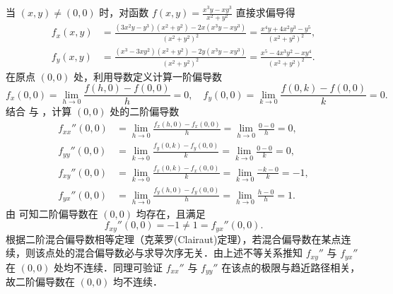 \begin{myproof}
    当 $(x, y) \neq (0, 0)$ 时，对函数 $f(x, y) = \frac{x^3 y - x y^3}{x^2 + y^2}$ 直接求偏导得
    \begin{equation}
        \label{eq:first-order-partials-1}
        \begin{aligned}
            f_x(x, y) & = \frac{(3x^2 y - y^3)(x^2 + y^2) - 2x(x^3 y - x y^3)}{(x^2 + y^2)^2} = \frac{x^4 y + 4x^2 y^3 - y^5}{(x^2 + y^2)^2}, \\
            f_y(x, y) & = \frac{(x^3 - 3x y^2)(x^2 + y^2) - 2y(x^3 y - x y^3)}{(x^2 + y^2)^2} = \frac{x^5 - 4x^3 y^2 - x y^4}{(x^2 + y^2)^2}.
        \end{aligned}
    \end{equation}
    在原点 $(0, 0)$ 处，利用导数定义计算一阶偏导数
    \begin{equation}
        \label{eq:origin-first-order-2}
        f_x(0, 0) = \lim_{h \to 0} \frac{f(h, 0) - f(0, 0)}{h} = 0, \quad f_y(0, 0) = \lim_{k \to 0} \frac{f(0, k) - f(0, 0)}{k} = 0.
    \end{equation}
    结合  与 ，计算 $(0, 0)$ 处的二阶偏导数
    \begin{equation}
        \label{eq:second-order-at-origin-3}
        \begin{aligned}
            f_{xx}''(0, 0) & = \lim_{h \to 0} \frac{f_x(h, 0) - f_x(0, 0)}{h} = \lim_{h \to 0} \frac{0 - 0}{h} = 0,   \\
            f_{yy}''(0, 0) & = \lim_{k \to 0} \frac{f_y(0, k) - f_y(0, 0)}{k} = \lim_{k \to 0} \frac{0 - 0}{k} = 0,   \\
            f_{xy}''(0, 0) & = \lim_{k \to 0} \frac{f_x(0, k) - f_x(0, 0)}{k} = \lim_{k \to 0} \frac{-k - 0}{k} = -1, \\
            f_{yx}''(0, 0) & = \lim_{h \to 0} \frac{f_y(h, 0) - f_y(0, 0)}{h} = \lim_{h \to 0} \frac{h - 0}{h} = 1.
        \end{aligned}
    \end{equation}
    由  可知二阶偏导数在 $(0, 0)$ 均存在，且满足
    \begin{equation}
        \boxed{f_{xy}''(0, 0) = -1 \neq 1 = f_{yx}''(0, 0)}.
    \end{equation}
    根据二阶混合偏导数相等定理（克莱罗(Clairaut)定理），若混合偏导数在某点连续，则该点处的混合偏导数必与求导次序无关．由上述不等关系推知 $f_{xy}''$ 与 $f_{yx}''$ 在 $(0, 0)$ 处均不连续．同理可验证 $f_{xx}''$ 与 $f_{yy}''$ 在该点的极限与趋近路径相关，故二阶偏导数在 $(0, 0)$ 均不连续．
\end{myproof}


